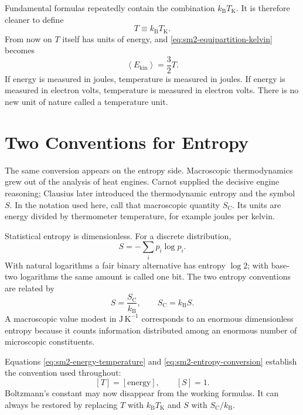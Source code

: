 Fundamental formulas repeatedly contain the combination
\(k_{\mathrm B}T_{\mathrm K}\). It is therefore cleaner to define
\begin{equation}
 T\equiv k_{\mathrm B}T_{\mathrm K}.
 \label{eq:sm2-energy-temperature}
\end{equation}
From now on \(T\) itself has units of energy, and
\eqref{eq:sm2-equipartition-kelvin} becomes
\begin{equation}
 \left\langle E_{\mathrm{kin}}\right\rangle=\frac{3}{2}T.
 \label{eq:sm2-equipartition-natural}
\end{equation}
If energy is measured in joules, temperature is measured in joules. If energy
is measured in electron volts, temperature is measured in electron volts.
There is no new unit of nature called a temperature unit.

\section{Two Conventions for Entropy}

The same conversion appears on the entropy side. Macroscopic thermodynamics
grew out of the analysis of heat engines. Carnot supplied the decisive engine
reasoning; Clausius later introduced the thermodynamic entropy and the symbol
\(S\). In the notation used here, call that macroscopic quantity
\(S_{\mathrm C}\). Its units are energy divided by thermometer temperature,
for example joules per kelvin.

Statistical entropy is dimensionless. For a discrete distribution,
\begin{equation}
 S=-\sum_i p_i\log p_i.
 \label{eq:sm2-statistical-entropy}
\end{equation}
With natural logarithms a fair binary alternative has entropy \(\log2\); with
base-two logarithms the same amount is called one bit. The two entropy
conventions are related by
\begin{equation}
 S=\frac{S_{\mathrm C}}{k_{\mathrm B}},
 \qquad
 S_{\mathrm C}=k_{\mathrm B}S.
 \label{eq:sm2-entropy-conversion}
\end{equation}
A macroscopic value modest in \(\mathrm{J\,K^{-1}}\) corresponds to an
enormous dimensionless entropy because it counts information distributed
among an enormous number of microscopic constituents.

Equations \eqref{eq:sm2-energy-temperature} and
\eqref{eq:sm2-entropy-conversion} establish the convention used throughout:
\[
 [T]=[\text{energy}],
 \qquad
 [S]=1.
\]
Boltzmann's constant may now disappear from the working formulas. It can
always be restored by replacing \(T\) with \(k_{\mathrm B}T_{\mathrm K}\) and
\(S\) with \(S_{\mathrm C}/k_{\mathrm B}\).

